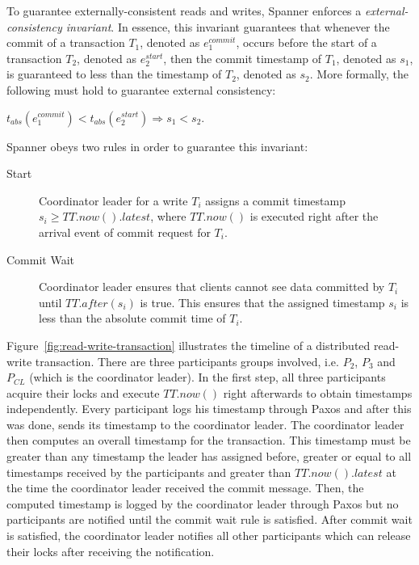 \documentclass[onecolumn, a4paper, 10pt]{article}
\begin{document}
To guarantee externally-consistent reads and writes, Spanner enforces a
\emph{external-consistency invariant}. In essence, this invariant guarantees that
whenever the commit of a transaction $T_1$, denoted as $e_1^{commit}$, occurs
before the start of a transaction $T_2$, denoted as $e_2^{start}$, then the commit
timestamp of $T_1$, denoted as $s_1$, is guaranteed to less than the timestamp
of $T_2$, denoted as $s_2$. More formally, the following must hold to guarantee
external consistency:
\begin{center}
$t_{abs}\left(e_1^{commit}\right) < t_{abs}\left(e_2^{start}\right) \Rightarrow s_1 < s_2$.
\end{center}

Spanner obeys two rules in order to guarantee this invariant:
\begin{description}
  \item[Start] Coordinator leader for a write $T_i$ assigns a commit timestamp
    $s_i \geq TT.now().latest$, where $TT.now()$ is executed right after the
    arrival event of commit request for $T_i$.
  \item[Commit Wait] Coordinator leader ensures that clients cannot see data
    committed by $T_i$ until $TT.after\left(s_i\right)$ is true. This ensures
    that the assigned timestamp $s_i$ is less than the absolute commit time of
    $T_i$.~\cite{Corbett:2012}
\end{description}

Figure~\ref{fig:read-write-transaction} illustrates the timeline of a distributed
read-write transaction. There are three participants groups involved, i.e. $P_2$,
$P_3$ and $P_{CL}$ (which is the coordinator leader). In the first step, all three
participants acquire their locks and execute $TT.now()$ right afterwards to obtain
timestamps independently. Every participant logs his timestamp through Paxos and
after this was done, sends its timestamp to the coordinator leader. The
coordinator leader then computes an overall timestamp for the transaction. This
timestamp must be greater than any timestamp the leader has assigned before,
greater or equal to all timestamps received by the participants and greater than
$TT.now().latest$ at the time the coordinator leader received the commit message.
Then, the computed timestamp is logged by the coordinator leader through Paxos
but no participants are notified until the commit wait rule is satisfied. After
commit wait is satisfied, the coordinator leader notifies all other participants
which can release their locks after receiving the notification.
\end{document}
